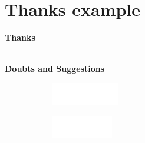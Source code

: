 \documentclass[aspectratio=169,t,xcolor=table]{beamer}
\begin{document}
\section{Thanks example}
\begin{frame}
    
    \centering
    \vspace{2cm}
    
    \textbf{\Huge Thanks}
    
    \ \\
    
    \textbf{Doubts and Suggestions}
    \ \\
    
    
    \vspace{2cm}
    \begin{figure}
        \centering
        \begin{subfigure}{0.2\textwidth}
            \centering
            \includegraphics[height=1cm]{assets/logos/infw.png}
        \end{subfigure}%
        \qquad 
        \begin{subfigure}{0.2\textwidth}
            \centering
            \includegraphics[height=1cm]{assets/logos/ufgw.png}
        \end{subfigure}
      
    \end{figure}
    
\end{frame}

\titlepage
\end{document}
